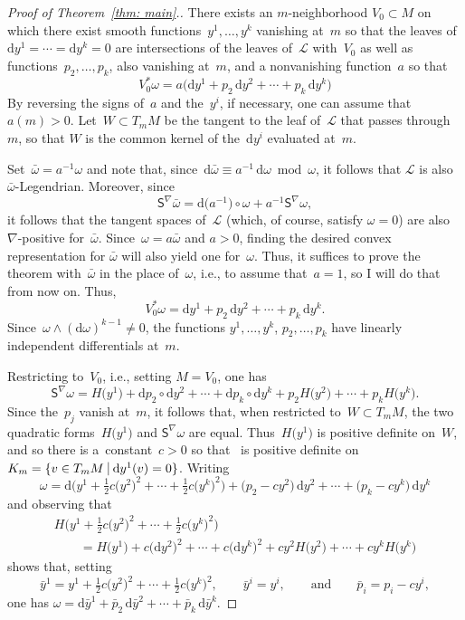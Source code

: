 \documentclass[11pt]{article}
\numberwithin{equation}{section}
\renewcommand{\d}{\mathrm{d}}%
\newcommand{\cL}{{\mathcal L}}
\newcommand{\Ss}{\mathsf{S}}
\newcommand{\w}{\wedge}
\numberwithin{equation}{section}
\begin{document}
\begin{proof}[Proof of Theorem~\ref{thm: main}.]
There exists an $m$-neighborhood $V_0\subset M$
on which there exist smooth functions~$y^1,\ldots,y^k$
vanishing at~$m$
so that the leaves of $\d y^1 =\cdots =\d y^k = 0$
are intersections of the leaves of~$\cL$ with~$V_0$
as well as functions~$p_2,\ldots,p_k$, also vanishing
at~$m$, and a nonvanishing function~$a$ so that
\[
V_0^*\omega
= a\bigl(\d y^1 + p_2\,\d y^2 +\cdots + p_k\,\d y^k\bigr)
\]
By reversing the signs of~$a$ and the~$y^i$,
if necessary, one can assume that~$a(m)>0$.
Let~$W\subset T_mM$ be the tangent to the leaf of~$\cL$
that passes through~$m$, so that $W$ is the common kernel
of the~$\d y^i$ evaluated at~$m$.

Set~$\bar\omega = a^{-1}\omega$ and note that,
since~$\d\bar\omega \equiv a^{-1}\,\d\omega \bmod \omega$,
it follows that $\cL$ is also $\bar\omega$-Legendrian.
Moreover, since
\[
\Ss^\nabla\bar\omega = \d\big(a^{-1}\big)\circ\omega + a^{-1} \Ss^\nabla\omega,
\]
it follows that the tangent spaces of~$\cL$
(which, of course, satisfy $\omega=0$)
are also $\nabla$-positive for~$\bar\omega$.
Since~$\omega = a \bar\omega$ and $a>0$,
finding the desired convex representation for $\bar\omega$
will also yield one for~$\omega$.
Thus, it suffices to prove the theorem with~$\bar\omega$
in the place of~$\omega$, i.e., to assume that~$a=1$,
so I will do that from now on. Thus,
\[
V_0^*\omega = \d y^1 + p_2\,\d y^2 +\cdots + p_k\,\d y^k.
\]
Since~$\omega\w(\d\omega)^{k-1}\not=0$, the functions
$y^1,\ldots,y^k$, $p_2,\ldots,p_k$ have linearly independent differentials
at~$m$.

Restricting to~$V_0$, i.e., setting $M=V_0$, one has
\[
\Ss^\nabla\omega = H\big(y^1\big) + \d p_2\circ \d y^2 + \cdots + \d p_k\circ \d y^k
 + p_2 H\big(y^2\big) + \cdots + p_k H\big(y^k\big).
\]
Since the~$p_j$ vanish at~$m$,
it follows that, when restricted to~$W\subset T_mM$,
the two quadratic forms~$H\big(y^1\big)$ and $\Ss^\nabla\omega$ are equal.
Thus~$H\big(y^1\big)$ is positive definite on~$W$,
and so there is a~constant~$c>0$
so that~\smash{$H\big(y^1\big) + c \big(\d y^2\big)^2 + \cdots + c \big(\d y^k\big)^2$}
is positive definite on~$K_m = \{v\in T_mM\ \vrule\ \d y^1(v) = 0\}$.
Writing
\[
\omega = \d\bigl(y^1 + \tfrac12c \big(y^2\big)^2 + \cdots + \tfrac12c \big(y^k\big)^2\bigr)
 + \big(p_2-c y^2\big)\,\d y^2 + \cdots + \big(p_k-c y^k\big)\,\d y^k
\]
and observing that
\begin{gather*}
H\big(y^1 + \tfrac12c \big(y^2\big)^2 + \cdots + \tfrac12c \big(y^k\big)^2\big)\\
\qquad = H\big(y^1\big) + c \big(\d y^2\big)^2 + \cdots + c \big(\d y^k\big)^2
 + c y^2 H\big(y^2\big) + \cdots + c y^k H\big(y^k\big)
\end{gather*}
shows that, setting
\[
\bar y^1 = y^1 + \tfrac12c \big(y^2\big)^2 + \cdots + \tfrac12c \big(y^k\big)^2,
\qquad
\bar y^i = y^i,
\qquad\text{and}\qquad
\bar p_i = p_i - c y^i,
\]
one has
$\omega = \d\bar y^1
 + \bar p_2\,\d \bar y^2 + \cdots + \bar p_k\,\d \bar y^k$.


\end{proof}
\end{document}
